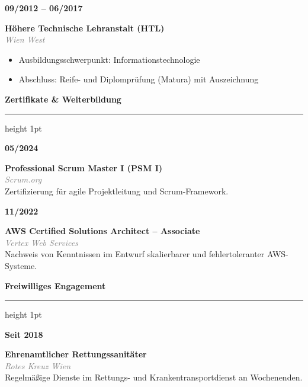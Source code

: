 \documentclass[10pt,a4paper]{article}
\newcommand{\cvsection}[1]{%
  \vspace{0.25cm}%
  {\large\bfseries\color{primary}#1}%
  \vspace{0.1cm}%
  \hrule height 1pt%
  \vspace{0.15cm}%
}
\newcommand{\cventry}[4]{%
  \noindent
  \begin{minipage}[t]{2.3cm}
    \raggedright\small\textbf{#1}
  \end{minipage}%
  \begin{minipage}[t]{\dimexpr\linewidth-2.3cm\relax}
    \raggedright
    \textbf{#2} \\
    \textcolor{graytext}{\small\textit{#3}} \\[0.05cm]
    {\small #4}
  \end{minipage}\par\vspace{0.22cm}
}
\begin{document}
\begin{minipage}[t]{0.65\textwidth}
  \cventry{09/2012 -- 06/2017}{Höhere Technische Lehranstalt (HTL)}{Wien West}{
    \begin{itemize}
      \item Ausbildungsschwerpunkt: Informationstechnologie
      \item Abschluss: Reife- und Diplomprüfung (Matura) mit Auszeichnung
    \end{itemize}
  }
  
  \cvsection{Zertifikate \& Weiterbildung}
  
  \cventry{05/2024}{Professional Scrum Master I (PSM I)}{Scrum.org}{
    Zertifizierung für agile Projektleitung und Scrum-Framework.
  }
  
  \cventry{11/2022}{AWS Certified Solutions Architect -- Associate}{Vertex Web Services}{
    Nachweis von Kenntnissen im Entwurf skalierbarer und fehlertoleranter AWS-Systeme.
  }
  
  \cvsection{Freiwilliges Engagement}
  
  \cventry{Seit 2018}{Ehrenamtlicher Rettungssanitäter}{Rotes Kreuz Wien}{
    Regelmäßige Dienste im Rettungs- und Krankentransportdienst an Wochenenden.
  }
\end{minipage}
\end{document}
